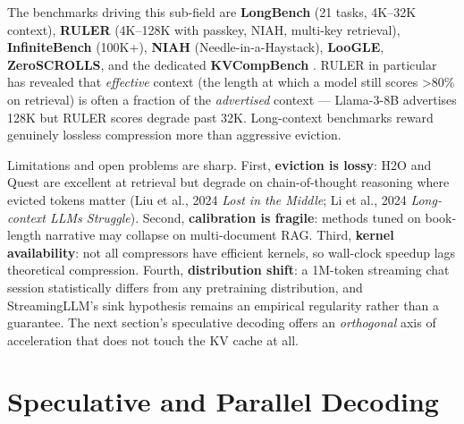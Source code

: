 \documentclass{article}
\begin{document}
The benchmarks driving this sub-field are \textbf{LongBench} (21 tasks, 4K--32K context), \textbf{RULER} (4K--128K with passkey, NIAH, multi-key retrieval), \textbf{InfiniteBench} (100K+), \textbf{NIAH} (Needle-in-a-Haystack), \textbf{LooGLE}, \textbf{ZeroSCROLLS}, and the dedicated \textbf{KVCompBench} \citep{yuan20242024}. RULER in particular has revealed that \emph{effective} context (the length at which a model still scores \textgreater80\% on retrieval) is often a fraction of the \emph{advertised} context --- Llama-3-8B advertises 128K but RULER scores degrade past 32K. Long-context benchmarks reward genuinely lossless compression more than aggressive eviction.

Limitations and open problems are sharp. First, \textbf{eviction is lossy}: H2O and Quest are excellent at retrieval but degrade on chain-of-thought reasoning where evicted tokens matter (Liu et al., 2024 \emph{Lost in the Middle}; Li et al., 2024 \emph{Long-context LLMs Struggle}). Second, \textbf{calibration is fragile}: methods tuned on book-length narrative may collapse on multi-document RAG. Third, \textbf{kernel availability}: not all compressors have efficient kernels, so wall-clock speedup lags theoretical compression. Fourth, \textbf{distribution shift}: a 1M-token streaming chat session statistically differs from any pretraining distribution, and StreamingLLM's sink hypothesis remains an empirical regularity rather than a guarantee. The next section's speculative decoding offers an \emph{orthogonal} axis of acceleration that does not touch the KV cache at all.

\section{Speculative and Parallel Decoding}\label{speculative-and-parallel-decoding}
\end{document}
